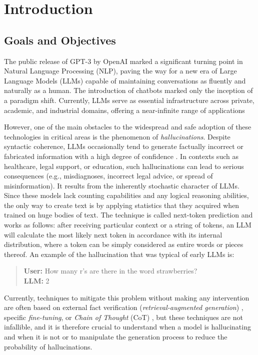 \chapter{Introduction}



\section{Goals and Objectives}
The public release of GPT-3 \cite{GPT3} by OpenAI marked a significant turning point in Natural Language Processing (NLP), paving the way for a new era of Large Language Models (LLMs) capable of maintaining conversations as fluently and naturally as a human. The introduction of chatbots marked only the inception of a paradigm shift. Currently, LLMs serve as essential infrastructure across private, academic, and industrial domains, offering a near-infinite range of applications

However, one of the main obstacles to the widespread and safe adoption of these technologies in critical areas is the phenomenon of \textit{hallucinations}. Despite syntactic coherence, LLMs occasionally tend to generate factually incorrect or fabricated information with a high degree of confidence \cite{surveyHallucination}. In contexts such as healthcare, legal support, or education, such hallucinations can lead to serious consequences (e.g., misdiagnoses, incorrect legal advice, or spread of misinformation). It results from the inherently stochastic character of LLMs. Since these models lack counting capabilities and any logical reasoning abilities, the only way to create text is by applying statistics that they acquired when trained on huge bodies of text. The technique is called next-token prediction and works as follows: after receiving particular context or a string of tokens, an LLM will calculate the most likely next token in accordance with its internal distribution, where a token can be simply considered as entire words or pieces thereof. An example of the hallucination that was typical of early LLMs is:
\begin{quote}
    \textbf{User:} How many r's are there in the word strawberries?\\
    \textbf{LLM:} 2
\end{quote}

Currently, techniques to mitigate this problem without making any intervention are often based on external fact verification (\textit{retrieval-augmented generation}) \cite{RAG}, specific \textit{fine-tuning}, or \textit{Chain of Thought} (CoT) \cite{CoT}, but these techniques are not infallible, and it is therefore crucial to understand when a model is hallucinating and when it is not or to manipulate the generation process to reduce the probability of hallucinations. 

